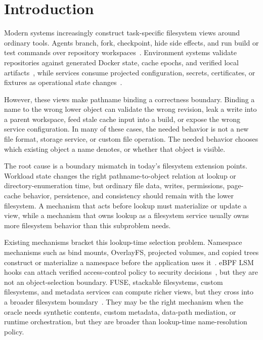\section{Introduction}

Modern systems increasingly construct task-specific filesystem views around
ordinary tools. Agents branch, fork, checkpoint, hide side effects, and run
build or test commands over repository
workspaces~\cite{agentfs_repo,branchfs_repo,yolofs_repo}. Environment systems
validate repositories against generated Docker state, cache epochs, and verified
local artifacts~\cite{docker_overview,swe_factory_repo,menvagent_repo,swe_rebench_v2_repo},
while services consume projected configuration, secrets, certificates, or
fixtures as operational state changes~\cite{kubernetes_projected_volumes,kubernetes_configmaps,kubernetes_secrets}.

However, these views make pathname binding a correctness boundary. Binding a
name to the wrong lower object can validate the wrong revision, leak a write
into a parent workspace, feed stale cache input into a build, or expose the
wrong service configuration. In many of these cases, the needed behavior is not
a new file format, storage service, or custom file operation. The needed
behavior chooses which existing object a name denotes, or whether that object is
visible.

The root cause is a boundary mismatch in today's filesystem extension points.
Workload state changes the right pathname-to-object relation at lookup or
directory-enumeration time, but ordinary file data, writes, permissions,
page-cache behavior, persistence, and consistency should remain with the lower
filesystem. A mechanism that acts before lookup must materialize or update a
view, while a mechanism that owns lookup as a filesystem service usually owns
more filesystem behavior than this subproblem needs.

Existing mechanisms bracket this lookup-time selection problem. Namespace
mechanisms such as bind mounts, OverlayFS, projected volumes, and copied trees
construct or materialize a namespace before the application uses
it~\cite{linux_mount,linux_overlayfs,kubernetes_projected_volumes}.
eBPF LSM hooks can attach verified access-control policy to security
decisions~\cite{linux_bpf_lsm},
but they are not an object-selection boundary. FUSE, stackable filesystems,
custom filesystems, and metadata services can compute richer views, but they
cross into a broader filesystem boundary~\cite{linux_fuse,wrapfs,bento,deltafs_sc21,indexfs,tablefs}.
They may be the right mechanism when the oracle needs synthetic contents,
custom metadata, data-path mediation, or runtime orchestration, but they are
broader than lookup-time name-resolution policy.

